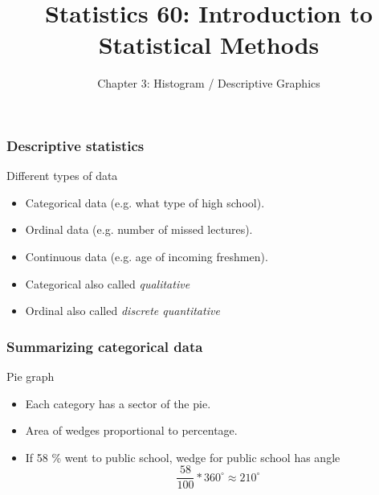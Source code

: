 \documentclass[handout]{beamer}
\title{Statistics 60: Introduction to Statistical Methods}
\subtitle{Chapter 3: Histogram / Descriptive Graphics}
\author{}%
\begin{document}
   \begin{frame}
   \titlepage
   \end{frame}


   \begin{frame} \frametitle{Descriptive statistics}

   \begin{block}
   {Different types of data}
   \begin{itemize}

   \item Categorical data (e.g. what type of high school).
   \item Ordinal data (e.g. number of missed lectures).
   \item Continuous data (e.g. age of incoming freshmen).
   \item Categorical also called {\em qualitative}
   \item Ordinal also called {\em discrete quantitative}
   \end{itemize}
   \end{block}
   \end{frame}


   \begin{frame} \frametitle{Summarizing categorical data}

   \begin{block}
   {Pie graph}
   \begin{itemize}

   \item Each category has a sector of the pie.
   \item Area of wedges proportional to percentage.
   \item If 58 \% went to public school, wedge for public school has angle
   $$
   \frac{58}{100} * 360^{\circ} \approx 210^{\circ}
   $$
   \end{itemize}
   \end{block}
   \end{frame}

\end{document}
